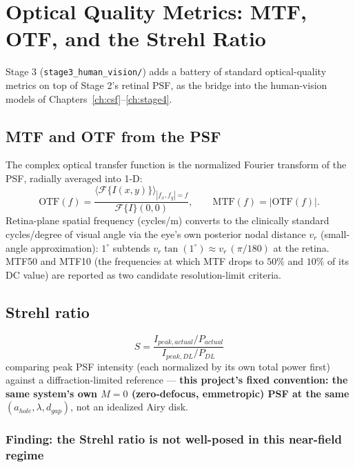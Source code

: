\chapter{Optical Quality Metrics: MTF, OTF, and the Strehl Ratio}
\label{ch:mtf_strehl}

Stage 3 (\texttt{stage3\_human\_vision/}) adds a battery of standard optical-quality
metrics on top of Stage 2's retinal PSF, as the bridge into the human-vision models of
Chapters~\ref{ch:csf}--\ref{ch:stage4}.

\section{MTF and OTF from the PSF}

The complex optical transfer function is the normalized Fourier transform of the PSF,
radially averaged into 1-D:
\begin{equation}
\text{OTF}(f) = \frac{\big\langle \mathcal{F}\{I(x,y)\}\big\rangle_{|f_x,f_y|=f}}
{\mathcal{F}\{I\}(0,0)}, \qquad \text{MTF}(f)=|\text{OTF}(f)|.
\end{equation}
Retina-plane spatial frequency (cycles/\textmu m) converts to the clinically standard
cycles/degree of visual angle via the eye's own posterior nodal distance $v_r$
(small-angle approximation): $1^\circ$ subtends $v_r\tan(1^\circ)\approx v_r\,(\pi/180)$
at the retina. MTF50 and MTF10 (the frequencies at which MTF drops to $50\%$ and
$10\%$ of its DC value) are reported as two candidate resolution-limit criteria.

\section{Strehl ratio}

\begin{equation}
S = \frac{I_{peak,actual}/P_{actual}}{I_{peak,DL}/P_{DL}}
\end{equation}
comparing peak PSF intensity (each normalized by its own total power first) against a
diffraction-limited reference --- \textbf{this project's fixed convention: the same
system's own $M=0$ (zero-defocus, emmetropic) PSF at the same $(a_{hole}, \lambda,
d_{gap})$}, not an idealized Airy disk.

\subsection*{Finding: the Strehl ratio is not well-posed in this near-field regime}

